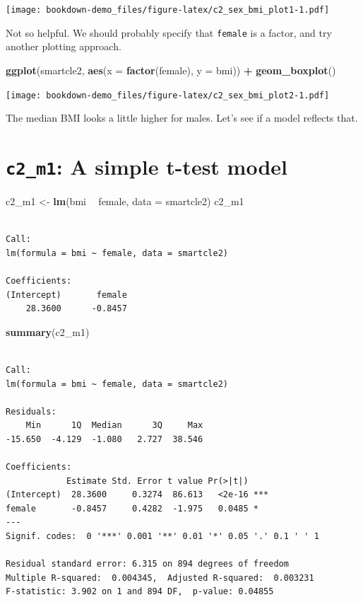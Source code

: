 \documentclass[]{book}
\newenvironment{Shaded}{\begin{snugshade}}{\end{snugshade}}
\newcommand{\KeywordTok}[1]{\textcolor[rgb]{0.13,0.29,0.53}{\textbf{#1}}}
\newcommand{\DataTypeTok}[1]{\textcolor[rgb]{0.13,0.29,0.53}{#1}}
\newcommand{\StringTok}[1]{\textcolor[rgb]{0.31,0.60,0.02}{#1}}
\newcommand{\OperatorTok}[1]{\textcolor[rgb]{0.81,0.36,0.00}{\textbf{#1}}}
\newcommand{\NormalTok}[1]{#1}
\theoremstyle{definition}
\theoremstyle{definition}
\theoremstyle{definition}
\theoremstyle{remark}
\begin{document}
\texttt{[image: bookdown-demo\_files/figure-latex/c2\_sex\_bmi\_plot1-1.pdf]}

Not so helpful. We should probably specify that \texttt{female} is a
factor, and try another plotting approach.

\begin{Shaded}
\begin{Highlighting}[]
\KeywordTok{ggplot}\NormalTok{(smartcle2, }\KeywordTok{aes}\NormalTok{(}\DataTypeTok{x =} \KeywordTok{factor}\NormalTok{(female), }\DataTypeTok{y =}\NormalTok{ bmi)) }\OperatorTok{+}
\StringTok{    }\KeywordTok{geom_boxplot}\NormalTok{()}
\end{Highlighting}
\end{Shaded}

\texttt{[image: bookdown-demo\_files/figure-latex/c2\_sex\_bmi\_plot2-1.pdf]}

The median BMI looks a little higher for males. Let's see if a model
reflects that.

\section{\texorpdfstring{\texttt{c2\_m1}: A simple t-test
model}{c2\_m1: A simple t-test model}}\label{c2_m1-a-simple-t-test-model}

\begin{Shaded}
\begin{Highlighting}[]
\NormalTok{c2_m1 <-}\StringTok{ }\KeywordTok{lm}\NormalTok{(bmi }\OperatorTok{~}\StringTok{ }\NormalTok{female, }\DataTypeTok{data =}\NormalTok{ smartcle2)}
\NormalTok{c2_m1}
\end{Highlighting}
\end{Shaded}

\begin{verbatim}

Call:
lm(formula = bmi ~ female, data = smartcle2)

Coefficients:
(Intercept)       female  
    28.3600      -0.8457  
\end{verbatim}

\begin{Shaded}
\begin{Highlighting}[]
\KeywordTok{summary}\NormalTok{(c2_m1)}
\end{Highlighting}
\end{Shaded}

\begin{verbatim}

Call:
lm(formula = bmi ~ female, data = smartcle2)

Residuals:
    Min      1Q  Median      3Q     Max 
-15.650  -4.129  -1.080   2.727  38.546 

Coefficients:
            Estimate Std. Error t value Pr(>|t|)    
(Intercept)  28.3600     0.3274  86.613   <2e-16 ***
female       -0.8457     0.4282  -1.975   0.0485 *  
---
Signif. codes:  0 '***' 0.001 '**' 0.01 '*' 0.05 '.' 0.1 ' ' 1

Residual standard error: 6.315 on 894 degrees of freedom
Multiple R-squared:  0.004345,  Adjusted R-squared:  0.003231 
F-statistic: 3.902 on 1 and 894 DF,  p-value: 0.04855
\end{verbatim}
\end{document}
